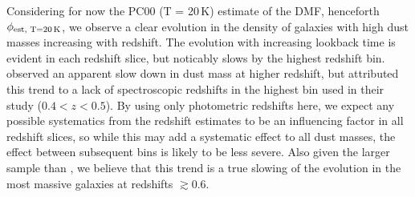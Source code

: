 Considering for now the PC00 (T = 20\,K) estimate of the DMF, henceforth $\phi_{\textrm{est, T=20\,K}}$, we observe a clear evolution in the density of galaxies with high dust masses increasing with redshift. The evolution with increasing lookback time is evident in each redshift slice, but noticably slows by the highest redshift bin. \citealt{Dunne_2011} observed an apparent slow down in dust mass at higher redshift, but attributed this trend to a lack of spectroscopic redshifts in the highest bin used in their study ($0.4 < z < 0.5$). By using only photometric redshifts here, we expect any possible systematics from the redshift estimates to be an influencing factor in all redshift slices, so while this may add a systematic effect to all dust masses, the effect between subsequent bins is likely to be less severe. Also given the larger sample than \citealt{Dunne_2011}, we believe that this trend is a true slowing of the evolution in the most massive galaxies at redshifts $\gtrsim 0.6$. 


